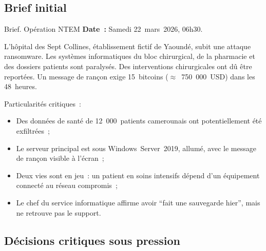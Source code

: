 \subsection{Brief initial}

\begin{boxscenario}{Brief. Opération NTEM}
\textbf{Date~:} Samedi 22~mars~2026, 06h30.

L'hôpital des Sept Collines, établissement fictif de Yaoundé, subit une attaque ransomware.
Les systèmes informatiques du bloc chirurgical, de la pharmacie
et des dossiers patients sont paralysés. Des interventions
chirurgicales ont dû être reportées. Un message de rançon
exige 15~bitcoins ($\approx$~750~000~USD) dans les 48~heures.

Particularités critiques~:
\begin{itemize}
    \item Des données de santé de 12~000~patients camerounais
          ont potentiellement été exfiltrées~;
    \item Le serveur principal est sous Windows~Server~2019,
          allumé, avec le message de rançon visible à l'écran~;
    \item Deux vies sont en jeu~: un patient en soins intensifs
          dépend d'un équipement connecté au réseau compromis~;
    \item Le chef du service informatique affirme avoir ``fait
          une sauvegarde hier'', mais ne retrouve pas le support.
\end{itemize}
\end{boxscenario}

\subsection{Décisions critiques sous pression}

